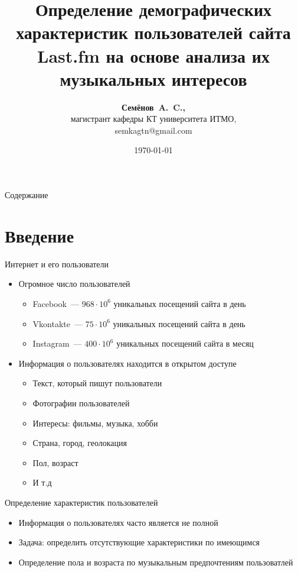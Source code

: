 \documentclass{beamer}
\title{Определение демографических характеристик пользователей
сайта Last.fm на основе анализа их музыкальных интересов}
\author{\textbf{Семёнов~A.~C.,} \\ 
    магистрант кафедры КТ университета ИТМО, \\
    semkagtn@gmail.com}
\institute{СПИСОК 2016}
\date{\today}
\begin{document}
\begin{frame}
  \titlepage
\end{frame}

\begin{frame}{Содержание}
  \tableofcontents
\end{frame}

\section{Введение}

\begin{frame}{Интернет и его пользователи}
  \begin{itemize}
      \item {Огромное число пользователей}
          \begin{itemize}
              \item {Facebook~--- $968 \cdot 10^{6}$ уникальных посещений сайта в день}
              \item {Vkontakte~--- $75 \cdot 10^{6}$ уникальных посещений сайта в день}
              \item {Instagram~--- $400 \cdot 10^{6}$ уникальных посещений сайта в месяц}
          \end{itemize}
      \pause
      \item {Информация о пользователях находится в открытом доступе}
          \begin{itemize}
              \item {Текст, который пишут пользователи}
              \item {Фотографии пользователей}
              \item {Интересы: фильмы, музыка, хобби}
              \item {Страна, город, геолокация}
              \item {Пол, возраст}
              \item {И т.д}
          \end{itemize}
  \end{itemize}
\end{frame}

\begin{frame}{Определение характеристик пользователей}
  \begin{itemize}
      \item {Информация о пользователях часто является не полной}
      \pause
      \item {Задача: определить отсутствующие характеристики по имеющимся}
      \pause
      \item {Определение пола и возраста по музыкальным предпочтениям пользоватлей}
  \end{itemize}
\end{frame}
\end{document}
